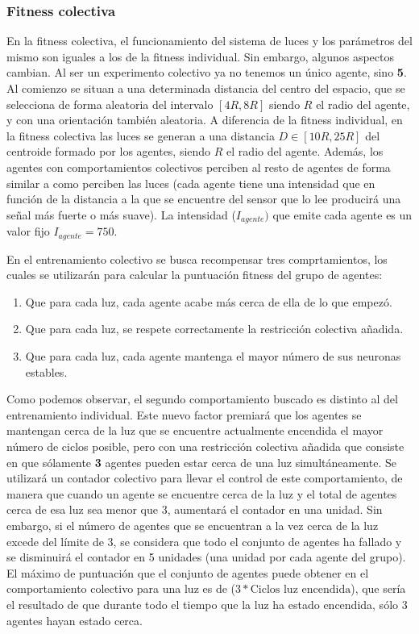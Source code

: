\subsubsection{Fitness colectiva}
En la fitness colectiva, el funcionamiento del sistema de luces y los parámetros del mismo son iguales a los de la fitness individual. Sin embargo, algunos aspectos cambian. Al ser un experimento colectivo ya no tenemos un único agente, sino \textbf{5}. Al comienzo se situan a una determinada distancia
del centro del espacio, que se selecciona de forma aleatoria del intervalo $[4R, 8R]$ siendo $R$ el radio del agente, y con una orientación también aleatoria. A diferencia de la fitness individual, en la fitness colectiva las luces se generan a una distancia $D \in [10R, 25R]$ del centroide
formado por los agentes, siendo $R$ el radio del agente. Además, los agentes con comportamientos colectivos perciben al resto de agentes de forma similar a como perciben las luces (cada agente tiene una intensidad que en función de la distancia a la que se encuentre del sensor que lo lee producirá una señal
más fuerte o más suave). La intensidad ($I_{agente})$ que emite cada agente es un valor fijo $I_{agente} = 750$.

En el entrenamiento colectivo se busca recompensar tres comprtamientos, los cuales se utilizarán para calcular la puntuación fitness del grupo de agentes:
\begin{enumerate}
	\item{Que para cada luz, cada agente acabe más cerca de ella de lo que empezó.}
	\item{Que para cada luz, se respete correctamente la restricción colectiva añadida.}
	\item{Que para cada luz, cada agente mantenga el mayor número de sus neuronas estables.}
\end{enumerate}

Como podemos observar, el segundo comportamiento buscado es distinto al del entrenamiento individual. Este nuevo factor premiará que los agentes se mantengan cerca de la luz que se encuentre actualmente encendida el mayor número de ciclos posible, pero con una restricción colectiva añadida que consiste
en que sólamente \textbf{3} agentes pueden estar cerca de una luz simultáneamente. Se utilizará un contador colectivo para llevar el control de este comportamiento, de manera que cuando un agente se encuentre cerca de la luz y el total de agentes cerca de esa luz sea menor que 3, aumentará el contador en una unidad. Sin
embargo, si el número de agentes que se encuentran a la vez cerca de la luz excede del límite de 3, se considera que todo el conjunto de agentes ha fallado y se disminuirá el contador en 5 unidades (una unidad por cada agente del grupo). El máximo de puntuación que el conjunto de agentes puede obtener en el comportamiento colectivo para una
luz es de ($3 * \text{Ciclos luz encendida}$), que sería el resultado de que durante todo el tiempo que la luz ha estado encendida, sólo 3 agentes hayan estado cerca.

